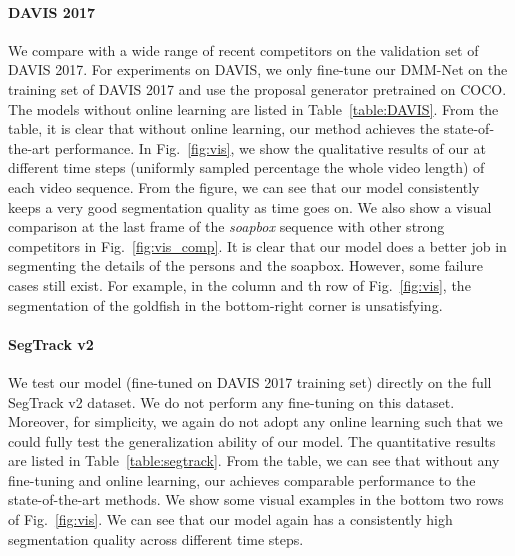 \paragraph{DAVIS 2017}
We compare with a wide range of recent competitors on the validation set of DAVIS 2017. For experiments on DAVIS, we only fine-tune our DMM-Net on the training set of DAVIS 2017 and use the proposal generator pretrained on COCO. 
The models without online learning are listed in Table~\ref{table:DAVIS}. 
From the table, it is clear that without online learning, our method achieves the state-of-the-art performance.
In Fig.~\ref{fig:vis}, we show the qualitative results of our {\ourmodelshort} at different time steps (uniformly sampled percentage \wrt the whole video length) of each video sequence.
From the figure, we can see that our model consistently keeps a very good segmentation quality as time goes on.
We also show a visual comparison at the last frame of the \textit{soapbox} sequence with other strong competitors in Fig.~\ref{fig:vis_comp}.
It is clear that our model does a better job in segmenting the details of the persons and the soapbox.
However, some failure cases still exist. 
For example, in the  column and th row of Fig.~\ref{fig:vis}, the segmentation of the goldfish in the bottom-right corner is unsatisfying.

\paragraph{SegTrack v2}
We test our {\ourmodelshort} model (fine-tuned on DAVIS 2017 training set) directly on the full SegTrack v2 dataset.
We do not perform any fine-tuning on this dataset. Moreover, for simplicity, we again do not adopt any online learning such that we could fully test the generalization ability of our model.
The quantitative results are listed in Table~\ref{table:segtrack}.
From the table, we can see that without any fine-tuning and online learning, our {\ourmodelshort} achieves comparable performance to the state-of-the-art methods.
We show some visual examples in the bottom two rows of Fig.~\ref{fig:vis}.
We can see that our model again has a consistently high segmentation quality across different time steps.


